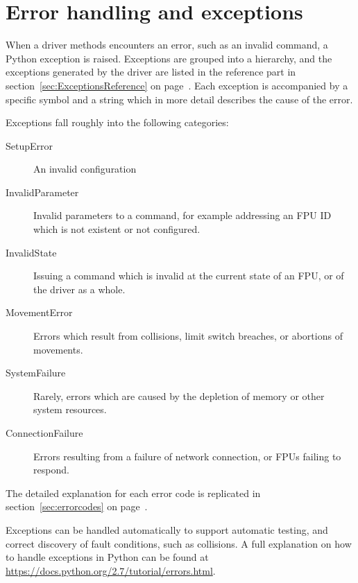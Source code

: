 \documentclass[11pt,a4paper]{scrartcl}
\begin{document}
\section{Error handling and exceptions}
\label{sec:errorhandling}
When a driver methods encounters an error, such as an invalid command,
a Python exception is raised. Exceptions are grouped into a hierarchy,
and the exceptions generated by the driver are listed in the reference
part in section~\ref{sec:ExceptionsReference} on
page~\pageref{sec:ExceptionsReference}. Each exception is accompanied
by a specific symbol and a string which in more detail describes the
cause of the error.

Exceptions fall roughly into the following categories:

\begin{description}
  \item[SetupError] An invalid configuration 
  \item[InvalidParameter] Invalid parameters to a command, for example addressing an FPU
    ID which is not existent or not configured.
  \item[InvalidState] Issuing a command which is invalid at the current state of
    an FPU, or of the driver as a whole.
  \item[MovementError] Errors which result from collisions, limit switch breaches,
    or abortions of movements.
  \item[SystemFailure] Rarely, errors which are caused by the depletion of memory
    or other system resources.
  \item[ConnectionFailure] Errors resulting from a failure of network connection, or FPUs failing to respond.
\end{description}

The detailed explanation for each error code is replicated in
section~\ref{sec:errorcodes} on page~\pageref{sec:errorcodes}.

Exceptions can be handled automatically to support automatic
testing, and correct discovery of fault conditions, such as
collisions. A full explanation on how to handle exceptions in Python can
be found at \url{https://docs.python.org/2.7/tutorial/errors.html}.
\end{document}
